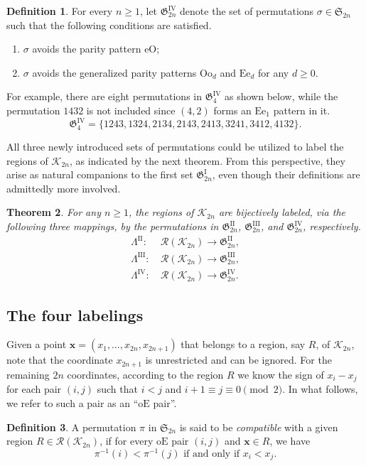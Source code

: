 \documentclass[11pt,reqno]{amsart}
\numberwithin{equation}{section}
\theoremstyle{plain}
\newtheorem{theorem}{Theorem}[section]
\theoremstyle{definition}
\newtheorem{Def}[theorem]{Definition}
\newcommand{\bx}{\mathbf{x}}
\renewcommand{\S}{\mathfrak{S}}
\newcommand{\fG}{\mathfrak{G}}
\newcommand{\cK}{\mathcal{K}}
\newcommand{\cR}{\mathcal{R}}
\newcommand{\GI}{\fG^{\mathrm{I}}}
\newcommand{\GII}{\fG^{\mathrm{II}}}
\newcommand{\GIII}{\fG^{\mathrm{III}}}
\newcommand{\GIV}{\fG^{\mathrm{IV}}}
\newcommand{\LII}{\Lambda^{\mathrm{II}}}
\newcommand{\LIII}{\Lambda^{\mathrm{III}}}
\newcommand{\LIV}{\Lambda^{\mathrm{IV}}}
\def\oE{\mathrm{oE}}
\def\eO{\mathrm{eO}}
\def\Oo{\mathrm{Oo}}
\def\Ee{\mathrm{Ee}}
\begin{document}
\begin{Def}
	For every $n\ge 1$, let $\GIV_{2n}$ denote the set of permutations $\sigma\in\S_{2n}$ such that the following conditions are satisfied.
	\begin{enumerate}
		\item $\sigma$ avoids the parity pattern $\eO$;
		\item $\sigma$ avoids the generalized parity patterns $\Oo_d$ and $\Ee_d$ for any $d\ge 0$.
	\end{enumerate}
\end{Def}

For example, there are eight permutations in $\GIV_{4}$ as shown below, while the permutation $1432$ is not included since $(4,2)$ forms an $\Ee_1$ pattern in it.
$$\GIV_{4}=\{1243,1324,2134,2143,2413,3241,3412,4132\}.$$

All three newly introduced sets of permutations could be utilized to label the regions of $\cK_{2n}$, as indicated by the next theorem. From this perspective, they arise as natural companions to the first set $\GI_{2n}$, even though their definitions are admittedly more involved.

\begin{theorem}\label{thm:three more labelings}
For any $n\ge 1$, the regions of $\cK_{2n}$ are bijectively labeled, via the following three mappings, by the permutations in $\GII_{2n}$, $\GIII_{2n}$, and $\GIV_{2n}$, respectively.
\begin{align*}
\LII: &~\cR(\cK_{2n}) \to \GII_{2n},\\
\LIII: &~\cR(\cK_{2n}) \to \GIII_{2n},\\
\LIV: &~\cR(\cK_{2n}) \to \GIV_{2n}.
\end{align*}
\end{theorem}


\subsection{The four labelings}\label{sub:la.model-1}
 Given a point $\bx=(x_1,\ldots,x_{2n},x_{2n+1})$ that belongs to a region, say $R$, of $\cK_{2n}$, note that the coordinate $x_{2n+1}$ is unrestricted and can be ignored. For the remaining $2n$ coordinates, according to the region $R$ we know the sign of $x_i-x_j$ for each pair $(i,j)$ such that $i<j$ and $i+1\equiv j\equiv 0\pmod 2$. In what follows, we refer to such a pair as an ``$\oE$ pair''. 
 
 \begin{Def}\label{def:compatible}
 	A permutation $\pi$ in $\S_{2n}$ is said to be {\it compatible} with a given region $R\in\cR(\cK_{2n})$, if for every $\oE$ pair $(i,j)$ and $\bx\in R$, we have
 	$$\pi^{-1}(i)<\pi^{-1}(j) \text{ if and only if } x_i<x_j.$$ 
 \end{Def}
 
\end{document}
